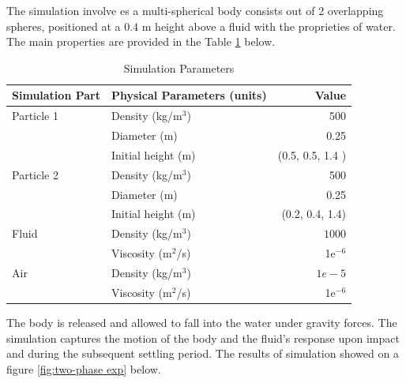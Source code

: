 The simulation involve es a multi-spherical body consists out of 2 overlapping spheres, positioned at a $0.4$ m height above a fluid with the proprieties of water. The main properties are provided in the Table \ref{table3-chap4} below.
\begin{table}[H]
    \centering
    \caption{Simulation Parameters} \label{table3-chap4}
    \begin{tabular}{llr}
        \toprule
        \hline
        Simulation Part         & Physical Parameters (units) & Value \\
        \hline
        \midrule
        Particle 1                & Density (kg/m$^3$)          & 500    \\
                         & Diameter (m)          & 0.25    \\
                         & Initial height (m)          & (0.5, 0.5, 1.4 )  \\
        Particle 2                & Density (kg/m$^3$)          & 500    \\
                         & Diameter (m)          & 0.25   \\
                         & Initial height (m)          &  (0.2, 0.4, 1.4)     \\
                         \hline
                                 Fluid                  & Density (kg/m$^3$)           & $1000$   \\
                                & Viscosity (m$^2$/s)         & 1e$^{-6}$    \\
                                \hline
         Air                  & Density (kg/m$^3$)           & $1e-5$   \\
                                & Viscosity (m$^2$/s)         & 1e$^{-6}$    \\
                                \hline
        \bottomrule
     \end{tabular}
\end{table}

The body is released and allowed to fall into the water under gravity forces. The simulation captures the motion of the body and the fluid's response upon impact and during the subsequent settling period. The results of simulation showed on a figure \ref{fig:two-phase exp} below.

